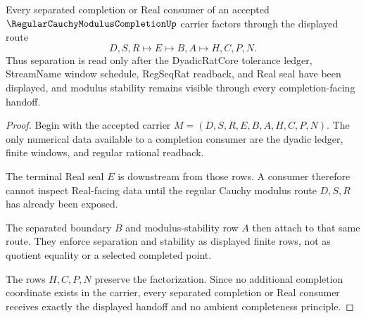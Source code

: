 \begin{theorem}
\label{thm:regular-cauchy-modulus-completion-separation}
Every separated completion or Real consumer of an accepted $\RegularCauchyModulusCompletionUp$ carrier factors through the displayed route
$$
D,S,R \longmapsto E \longmapsto B,A \longmapsto H,C,P,N .
$$
Thus separation is read only after the DyadicRatCore tolerance ledger, StreamName window schedule, RegSeqRat readback, and Real seal have been displayed, and modulus stability remains visible through every completion-facing handoff.
\end{theorem}
\begin{proof}
Begin with the accepted carrier $M=(D,S,R,E,B,A,H,C,P,N)$. The only numerical data available to a completion consumer are the dyadic ledger, finite windows, and regular rational readback.

The terminal Real seal $E$ is downstream from those rows. A consumer therefore cannot inspect Real-facing data until the regular Cauchy modulus route $D,S,R$ has already been exposed.

The separated boundary $B$ and modulus-stability row $A$ then attach to that same route. They enforce separation and stability as displayed finite rows, not as quotient equality or a selected completed point.

The rows $H,C,P,N$ preserve the factorization. Since no additional completion coordinate exists in the carrier, every separated completion or Real consumer receives exactly the displayed handoff and no ambient completeness principle.
\end{proof}




